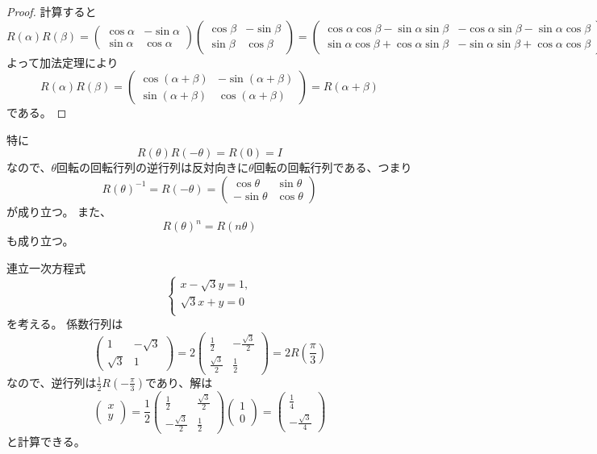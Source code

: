 \begin{proof}
計算すると
$$
R(\alpha)R(\beta)
= \begin{pmatrix}\cos\alpha & -\sin\alpha \\ \sin\alpha & \cos\alpha\end{pmatrix}\begin{pmatrix}\cos\beta & -\sin\beta \\ \sin\beta & \cos\beta\end{pmatrix}
= \begin{pmatrix}\cos\alpha\cos\beta-\sin\alpha\sin\beta & -\cos\alpha\sin\beta-\sin\alpha\cos\beta \\ \sin\alpha\cos\beta+\cos\alpha\sin\beta & -\sin\alpha\sin\beta+\cos\alpha\cos\beta\end{pmatrix}.
$$
よって加法定理により
$$
R(\alpha)R(\beta)
= \begin{pmatrix}\cos(\alpha+\beta) & -\sin(\alpha+\beta) \\ \sin(\alpha+\beta) & \cos(\alpha+\beta)\end{pmatrix}
= R(\alpha+\beta)
$$
である。
\end{proof}

特に
$$
R(\theta)R(-\theta) = R(0) = I
$$
なので、$\theta$回転の回転行列の逆行列は反対向きに$\theta$回転の回転行列である、つまり
$$
R(\theta)^{-1} = R(-\theta) = \begin{pmatrix}\cos\theta & \sin\theta \\ -\sin\theta & \cos\theta\end{pmatrix}
$$
が成り立つ。
また、
$$
R(\theta)^n = R(n\theta)
$$
も成り立つ。

\begin{example}
連立一次方程式
$$
\begin{cases}
x-\sqrt{3}y = 1, \\
\sqrt{3}x+y = 0 \\
\end{cases}
$$
を考える。
係数行列は
$$
\begin{pmatrix}1 & -\sqrt{3} \\ \sqrt{3} & 1\end{pmatrix}
= 2\begin{pmatrix}\frac{1}{2} & -\frac{\sqrt{3}}{2} \\ \frac{\sqrt{3}}{2} & \frac{1}{2}\end{pmatrix}
= 2 R(\frac{\pi}{3})
$$
なので、逆行列は$\frac{1}{2}R(-\frac{\pi}{3})$であり、解は
$$
\begin{pmatrix}x \\ y\end{pmatrix}
= \frac{1}{2}\begin{pmatrix}\frac{1}{2} & \frac{\sqrt{3}}{2} \\ -\frac{\sqrt{3}}{2} & \frac{1}{2}\end{pmatrix}\begin{pmatrix}1 \\ 0\end{pmatrix}
= \begin{pmatrix}\frac{1}{4} \\ -\frac{\sqrt{3}}{4}\end{pmatrix}
$$
と計算できる。
\end{example}
